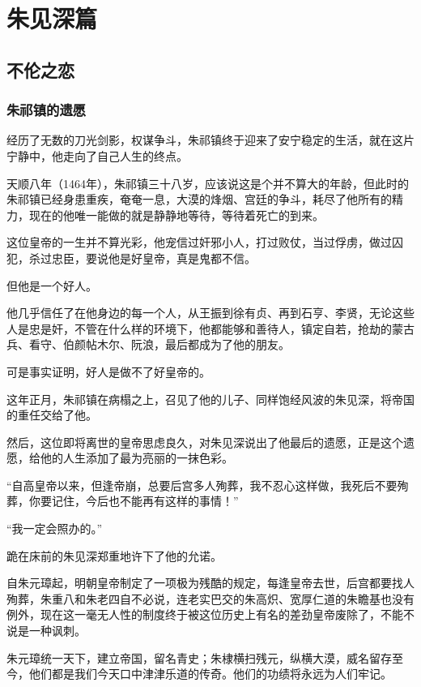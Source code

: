 \chapter*{朱见深篇}
\section{不伦之恋}
\ifnum{}
	\begin{multicols}{\theparacolNo}
		\fi
		\subsection{朱祁镇的遗愿}
		经历了无数的刀光剑影，权谋争斗，朱祁镇终于迎来了安宁稳定的生活，就在这片宁静中，他走向了自己人生的终点。

		天顺八年（1464年），朱祁镇三十八岁，应该说这是个并不算大的年龄，但此时的朱祁镇已经身患重疾，奄奄一息，大漠的烽烟、宫廷的争斗，耗尽了他所有的精力，现在的他唯一能做的就是静静地等待，等待着死亡的到来。

		这位皇帝的一生并不算光彩，他宠信过奸邪小人，打过败仗，当过俘虏，做过囚犯，杀过忠臣，要说他是好皇帝，真是鬼都不信。

		但他是一个好人。

		他几乎信任了在他身边的每一个人，从王振到徐有贞、再到石亨、李贤，无论这些人是忠是奸，不管在什么样的环境下，他都能够和善待人，镇定自若，抢劫的蒙古兵、看守、伯颜帖木尔、阮浪，最后都成为了他的朋友。

		可是事实证明，好人是做不了好皇帝的。

		这年正月，朱祁镇在病榻之上，召见了他的儿子、同样饱经风波的朱见深，将帝国的重任交给了他。

		然后，这位即将离世的皇帝思虑良久，对朱见深说出了他最后的遗愿，正是这个遗愿，给他的人生添加了最为亮丽的一抹色彩。

		“自高皇帝以来，但逢帝崩，总要后宫多人殉葬，我不忍心这样做，我死后不要殉葬，你要记住，今后也不能再有这样的事情！”

		“我一定会照办的。”

		跪在床前的朱见深郑重地许下了他的允诺。

		自朱元璋起，明朝皇帝制定了一项极为残酷的规定，每逢皇帝去世，后宫都要找人殉葬，朱重八和朱老四自不必说，连老实巴交的朱高炽、宽厚仁道的朱瞻基也没有例外，现在这一毫无人性的制度终于被这位历史上有名的差劲皇帝废除了，不能不说是一种讽刺。

		朱元璋统一天下，建立帝国，留名青史；朱棣横扫残元，纵横大漠，威名留存至今，他们都是我们今天口中津津乐道的传奇。他们的功绩将永远为人们牢记。


\end{multicols}
